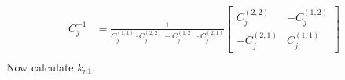 \documentclass{article}
\begin{document}
\begin{align*}
	C_j^{-1}            & = \frac{1}{C^{(1, 1)}_{j}\cdot C^{(2, 2)}_{j} - C^{(1, 2)}_{j}\cdot C^{(2, 1)}_{j}}\begin{bmatrix} C^{(2, 2)}_{j} & -C^{(1, 2)}_{j} \\ -C^{(2, 1)}_{j} & C^{(1, 1)}_{j} \end{bmatrix}                                                                                                                                                                                                                                                                                                                                                                                                                                                                                                                                                                                 \\
\end{align*}
Now calculate $k_{n1}$.
\end{document}
